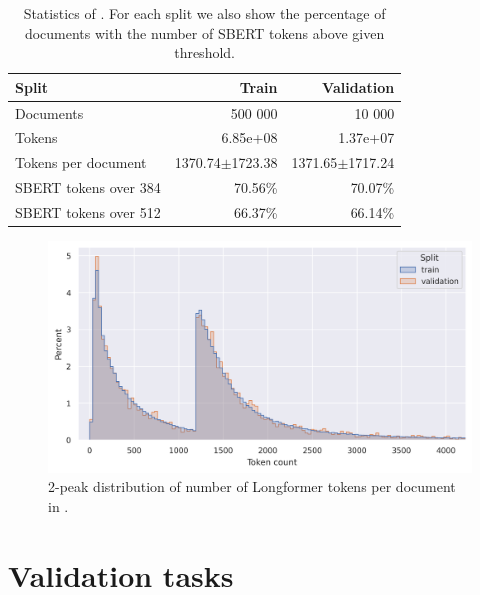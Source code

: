 \begin{table}
  \centering
  \begin{tabular}{lrr}
\toprule
Split & Train & Validation \\
\midrule
Documents & 500 000 & 10 000 \\
Tokens & 6.85e+08 & 1.37e+07 \\
Tokens per document & 1370.74$\pm$1723.38 & 1371.65$\pm$1717.24 \\
SBERT tokens over 384 & 70.56\% & 70.07\% \\
SBERT tokens over 512 & 66.37\% & 66.14\% \\
\bottomrule
\end{tabular}

  \caption{Statistics of . For each split we also show the
  percentage of documents with the number of SBERT tokens above given
  threshold.}

  \label{table:val_data_stats}

\end{table}

\begin{figure}

  \includegraphics[width=\textwidth]{./img/val_data_dist.png}

  \caption{2-peak distribution of number of Longformer tokens per document in
    .}

  \label{fig:val_data_dist}

\end{figure}

\section{Validation tasks}\label{section:validation_tasks}


